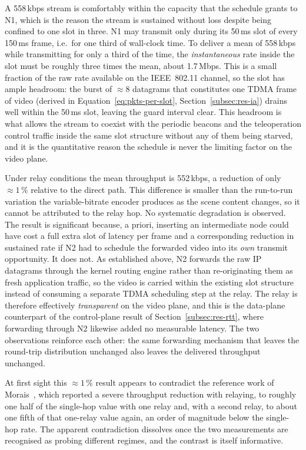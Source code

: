A 558\,kbps stream is comfortably within the capacity that the schedule grants
to N1, which is the reason the stream is sustained without loss despite being
confined to one slot in three. N1 may transmit only during its 50\,ms slot of
every 150\,ms frame, i.e.\ for one third of wall-clock time. To deliver a
mean of 558\,kbps while transmitting for only a third of the time, the
\emph{instantaneous} rate inside the slot must be roughly three times the mean,
about 1.7\,Mbps. This is a small fraction of the raw rate available on the
IEEE~802.11 channel, so the slot has ample headroom: the burst of $\approx 8$
datagrams that constitutes one TDMA frame of video (derived in
Equation~\ref{eq:pkts-per-slot}, Section~\ref{subsec:res-ia}) drains well
within the 50\,ms slot, leaving the guard interval clear. This headroom is what
allows the stream to coexist with the periodic beacons and the teleoperation
control traffic inside the same slot structure without any of them being
starved, and it is the quantitative reason the schedule is never the limiting
factor on the video plane.

Under relay conditions the mean throughput is 552\,kbps, a reduction of only
$\approx 1\,\%$ relative to the direct path. This difference is smaller than
the run-to-run variation the variable-bitrate encoder produces as the scene
content changes, so it cannot be attributed to the relay hop. No systematic
degradation is observed. The result is significant because, a priori, inserting
an intermediate node could have cost a full extra slot of latency per frame and
a corresponding reduction in sustained rate if N2 had to schedule the forwarded
video into its \emph{own} transmit opportunity. It does not. As established
above, N2 forwards the raw IP datagrams through the kernel routing engine
rather than re-originating them as fresh application traffic, so the video is
carried within the existing slot structure instead of consuming a separate
TDMA scheduling step at the relay. The relay is therefore effectively
\emph{transparent} on the video plane, and this is the data-plane counterpart
of the control-plane result of Section~\ref{subsec:res-rtt}, where forwarding
through N2 likewise added no measurable latency. The two observations reinforce
each other: the same forwarding mechanism that leaves the round-trip
distribution unchanged also leaves the delivered throughput unchanged.

At first sight this $\approx 1\,\%$ result appears to contradict the reference
work of Morais~\cite{morais2024synchronization}, which reported a severe
throughput reduction with relaying, to roughly one half of the single-hop
value with one relay and, with a second relay, to about one fifth of that
one-relay value again, an order of magnitude below the single-hop rate. The
apparent contradiction dissolves once the two measurements are recognised as
probing different regimes, and the contrast is itself informative.

